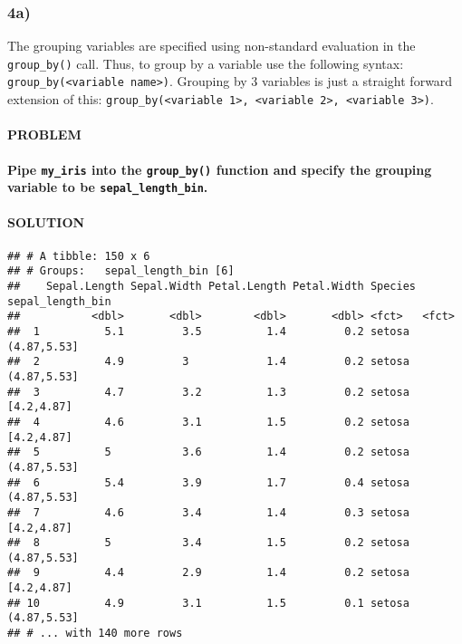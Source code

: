 \documentclass[]{article}
\newenvironment{Shaded}{\begin{snugshade}}{\end{snugshade}}
\newcommand{\CommentTok}[1]{\textcolor[rgb]{0.56,0.35,0.01}{\textit{#1}}}
\newcommand{\KeywordTok}[1]{\textcolor[rgb]{0.13,0.29,0.53}{\textbf{#1}}}
\newcommand{\NormalTok}[1]{#1}
\newcommand{\OperatorTok}[1]{\textcolor[rgb]{0.81,0.36,0.00}{\textbf{#1}}}
\newcommand{\StringTok}[1]{\textcolor[rgb]{0.31,0.60,0.02}{#1}}
\let\oldparagraph\paragraph
\renewcommand{\paragraph}[1]{\oldparagraph{#1}\mbox{}}
\begin{document}
\hypertarget{a-3}{%
\subsubsection{4a)}\label{a-3}}

The grouping variables are specified using non-standard evaluation in
the \texttt{group\_by()} call. Thus, to group by a variable use the
following syntax:
\texttt{group\_by(\textless{}variable\ name\textgreater{})}. Grouping by
3 variables is just a straight forward extension of this:
\texttt{group\_by(\textless{}variable\ 1\textgreater{},\ \textless{}variable\ 2\textgreater{},\ \textless{}variable\ 3\textgreater{})}.

\hypertarget{problem-18}{%
\paragraph{PROBLEM}\label{problem-18}}

\textbf{Pipe \texttt{my\_iris} into the \texttt{group\_by()} function
and specify the grouping variable to be \texttt{sepal\_length\_bin}.}

\hypertarget{solution-17}{%
\paragraph{SOLUTION}\label{solution-17}}

\begin{Shaded}
\end{Shaded}

\begin{verbatim}
## # A tibble: 150 x 6
## # Groups:   sepal_length_bin [6]
##    Sepal.Length Sepal.Width Petal.Length Petal.Width Species sepal_length_bin
##           <dbl>       <dbl>        <dbl>       <dbl> <fct>   <fct>           
##  1          5.1         3.5          1.4         0.2 setosa  (4.87,5.53]     
##  2          4.9         3            1.4         0.2 setosa  (4.87,5.53]     
##  3          4.7         3.2          1.3         0.2 setosa  [4.2,4.87]      
##  4          4.6         3.1          1.5         0.2 setosa  [4.2,4.87]      
##  5          5           3.6          1.4         0.2 setosa  (4.87,5.53]     
##  6          5.4         3.9          1.7         0.4 setosa  (4.87,5.53]     
##  7          4.6         3.4          1.4         0.3 setosa  [4.2,4.87]      
##  8          5           3.4          1.5         0.2 setosa  (4.87,5.53]     
##  9          4.4         2.9          1.4         0.2 setosa  [4.2,4.87]      
## 10          4.9         3.1          1.5         0.1 setosa  (4.87,5.53]     
## # ... with 140 more rows
\end{verbatim}
\end{document}
